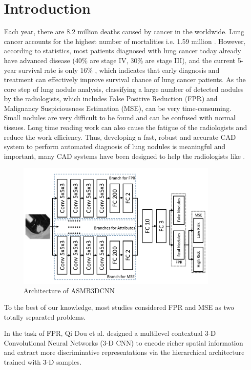 \documentclass[runningheads]{llncs}
\begin{document}
\section{Introduction}
Each year, there are 8.2 million deaths caused by cancer in the worldwide. Lung cancer accounts for the highest number of mortalities i.e. 1.59 million \cite{Wild2014International}. However, according to statistics, most patients diagnosed with lung cancer today already have advanced disease (40\% are stage IV, 30\% are stage III), and the current 5-year survival rate is only 16\% \cite{Bach2012Benefits}, which indicates that early diagnosis and treatment can effectively improve survival chance of lung cancer patients. As the core step of lung nodule analysis, classifying a large number of detected nodules by the radiologists, which includes False Positive Reduction (FPR) and Malignancy Suspiciousness Estimation (MSE), can be very time-consuming. Small nodules are very difficult to be found and can be confused with normal tissues. Long time reading work can also cause the fatigue of the radiologists and reduce the work efficiency. Thus, developing a fast, robust and accurate CAD system to perform automated diagnosis of lung nodules is meaningful and important\cite{Greenspan2016Guest}, many CAD systems have been designed to help the radiologists like \cite{rajpurkar2017chexnet} \cite{wang2018tienet} \cite{Causey2018Highly} .

\begin{figure}[*t]
\centerline{\includegraphics[width=100mm]{fig1.pdf}}
\vspace{-0.0cm}
\caption{Architecture of ASMB3DCNN}
\vspace{-0.5cm}
\label{fig1}
\end{figure}


To the best of our knowledge, most studies considered FPR and MSE as two totally separated problems.

In the task of FPR, Qi Dou et al. \cite{Qi2016Multilevel} designed a multilevel contextual 3-D Convolutional Neural Networks (3-D CNN) to encode richer spatial information and extract more discriminative representations via the hierarchical architecture trained with 3-D samples.
\end{document}
